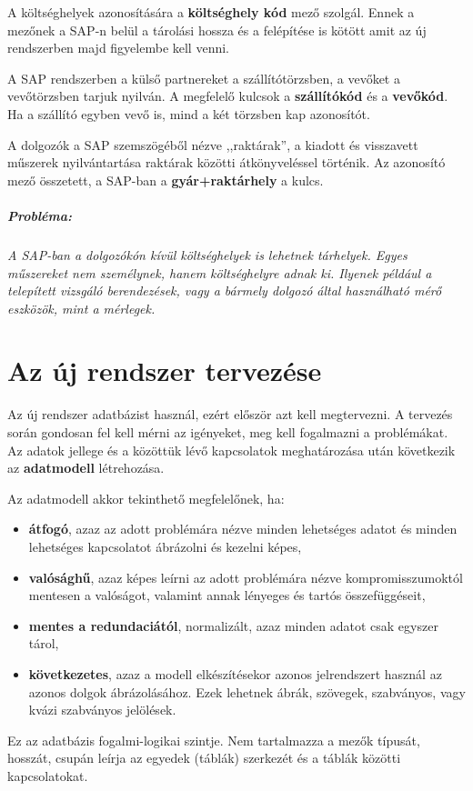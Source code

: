 \documentclass[a4paper,12pt]{report}
\begin{document}
A költséghelyek azonosítására a \textbf{költséghely kód} mező szolgál. Ennek a 
mezőnek a SAP-n belül a tárolási hossza és a felépítése is kötött amit az új 
rendszerben majd figyelembe kell venni.

A SAP rendszerben a külső partnereket a szállítótörzsben, a vevőket a 
vevőtörzsben tarjuk nyilván. A megfelelő kulcsok a \textbf{szállítókód} és a 
\textbf{vevőkód}. Ha a szállító egyben vevő is, mind a két törzsben kap 
azonosítót.

A dolgozók a SAP szemszögéből nézve ,,raktárak'', a kiadott és 
visszavett műszerek nyilvántartása raktárak közötti átkönyveléssel történik. Az 
azonosító mező összetett, a SAP-ban a \textbf{gyár+raktárhely} a kulcs.

\paragraph*{Probléma:}
\textit{
A SAP-ban a dolgozókón kívül költséghelyek is lehetnek tárhelyek. Egyes 
műszereket nem személynek, hanem költséghelyre adnak ki. Ilyenek például a 
telepített vizsgáló berendezések, vagy a bármely dolgozó által használható mérő 
eszközök, mint a mérlegek.
}

\chapter{Az új rendszer tervezése}

Az új rendszer adatbázist használ, ezért először azt kell megtervezni. 
A tervezés során gondosan fel kell mérni az igényeket, meg kell fogalmazni a 
problémákat. Az adatok jellege és a közöttük lévő kapcsolatok meghatározása 
után következik az \textbf{adatmodell} létrehozása. 

Az adatmodell akkor tekinthető megfelelőnek, ha:
\begin{itemize}
 \item \textbf{átfogó}, azaz az adott problémára nézve minden lehetséges adatot
 és minden lehetséges kapcsolatot ábrázolni és kezelni képes,
 \item \textbf{valósághű}, azaz képes leírni az adott problémára nézve
 kompromisszumoktól mentesen a valóságot, valamint annak lényeges és tartós 
 összefüggéseit,
 \item \textbf{mentes a redundaciától}, normalizált, azaz minden adatot csak 
egyszer tárol,
 \item \textbf{következetes}, azaz a modell elkészítésekor azonos jelrendszert 
használ az azonos dolgok ábrázolásához. Ezek lehetnek ábrák, szövegek, szabványos, vagy kvázi szabványos jelölések.
\end{itemize}
Ez az adatbázis fogalmi-logikai szintje. Nem tartalmazza a mezők típusát, 
hosszát, csupán leírja az egyedek (táblák) szerkezét és a táblák közötti 
kapcsolatokat.
\end{document}
